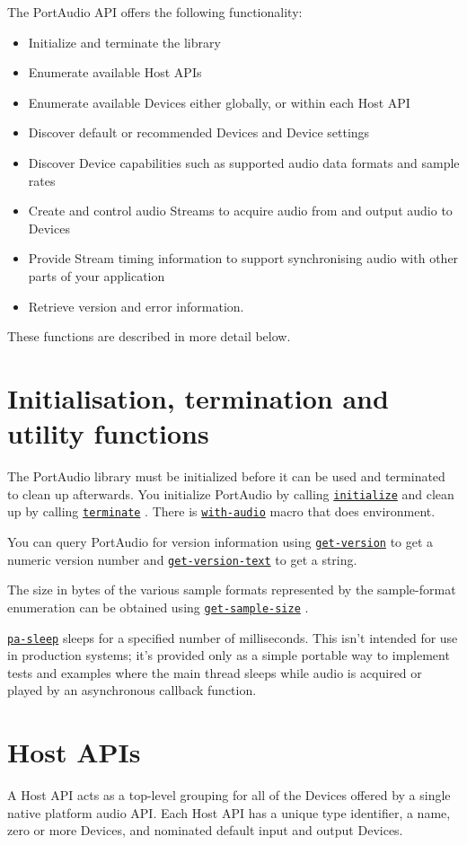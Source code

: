 \documentclass[a4paper]{report}
\begin{document}
The PortAudio API offers the following functionality:
    \begin{itemize}
      
    \item Initialize and terminate the library
    \item Enumerate available Host APIs
    \item Enumerate available Devices either globally, or within each Host API
    \item Discover default or recommended Devices and Device settings
    \item Discover Device capabilities such as supported audio data formats and sample rates
    \item Create and control audio Streams to acquire audio from and output audio to Devices
    \item Provide Stream timing information to support synchronising audio with other parts of your application
    \item Retrieve version and error information.
    \end{itemize}
  
These functions are described in more detail below.

\section{Initialisation, termination and utility functions} \label{d0d0e0e0e0e4}The PortAudio library must be initialized before it can be used and terminated to clean up afterwards. You initialize PortAudio by calling \hyperref[portaudio__fun__initialize]{\texttt{initialize}}
   and clean up by calling \hyperref[portaudio__fun__terminate]{\texttt{terminate}}
  . There is \hyperref[portaudio__fun__with-audio]{\texttt{with-audio}}
   macro that does environment.

You can query PortAudio for version information using \hyperref[portaudio__fun__get-version]{\texttt{get-version}}
   to get a numeric version number and \hyperref[portaudio__fun__get-version-text]{\texttt{get-version-text}}
   to get a string.

The size in bytes of the various sample formats represented by the sample-format enumeration can be obtained using \hyperref[portaudio__fun__get-sample-size]{\texttt{get-sample-size}}
  .

\hyperref[portaudio__fun__pa-sleep]{\texttt{pa-sleep}}
   sleeps for a specified number of milliseconds. This isn't intended for use in production systems; it's provided only as a simple portable way to implement tests and examples where the main thread sleeps while audio is acquired or played by an asynchronous callback function.\section{Host APIs} \label{d0d0e0e0e0e5}
A Host API acts as a top-level grouping for all of the Devices offered by a single native platform audio API. Each Host API has a unique type identifier, a name, zero or more Devices, and nominated default input and output Devices.
\end{document}
